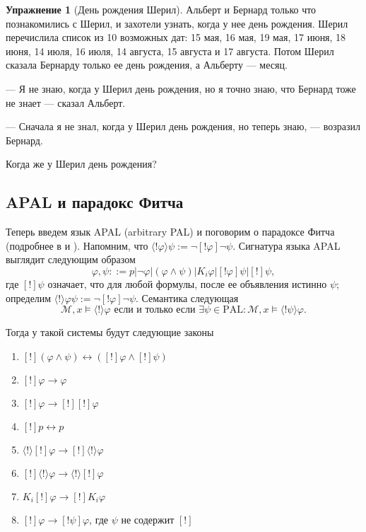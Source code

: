 \documentclass[openany]{book}
\theoremstyle{plain}
\theoremstyle{definition}
\newtheorem{xrc}{Упражнение}[]
\begin{document}
\begin{xrc}[День рождения Шерил]
Альберт и Бернард только что познакомились с Шерил, и захотели узнать, когда у нее день рождения. Шерил перечислила список из 10 возможных дат: 15 мая, 16 мая, 19 мая, 17 июня, 18 июня, 14 июля, 16 июля, 14 августа, 15 августа и 17 августа. Потом Шерил сказала Бернарду только ее день рождения, а Альберту --- месяц.

--- Я не знаю, когда у Шерил день рождения, но я точно знаю, что Бернард тоже не знает --- сказал Альберт.

--- Сначала я не знал, когда у Шерил день рождения, но теперь знаю, --- возразил Бернард.

Когда же у Шерил день рождения?

\end{xrc}

\subsection{APAL и парадокс Фитча}

Теперь введем язык APAL (arbitrary PAL) и поговорим о парадоксе Фитча (подробнее в \cite{Benthem} и \cite{Balbiani}). Напомним, что \(\langle !\varphi \rangle \psi := \neg [!\varphi] \neg \psi\). Сигнатура языка APAL выглядит следующим образом \[\varphi, \psi ::= p | \neg \varphi | (\varphi \land \psi) | K_i \varphi | [!\varphi] \psi | [!] \psi, \] где \([!]\psi\) означает, что для любой формулы, после ее объявления истинно \(\psi\); определим \(\langle ! \rangle \varphi \psi:= \neg [!\varphi] \neg \psi\). Семантика следующая \[\mathcal{M}, x \models \langle ! \rangle \varphi \text{ если и только если } \exists \psi \in \mathrm{PAL} : \mathcal{M}, x \models \langle ! \psi \rangle \varphi.\]

Тогда у такой системы будут следующие законы
\begin{enumerate}
\item \([!](\varphi \land \psi) \leftrightarrow ([!] \varphi \land [!] \psi)\)
\item \([!] \varphi \to \varphi\)
\item \([!] \varphi \to [!][!] \varphi\)
\item \([!]p \leftrightarrow p\)
\item \(\langle ! \rangle [!] \varphi \to [!] \langle ! \rangle \varphi\)
\item \([!] \langle ! \rangle \varphi \to \langle ! \rangle [!] \varphi\)
\item \(K_i [!] \varphi \to [!] K_i \varphi\)
\item \([!] \varphi \to [! \psi] \varphi\), где \(\psi\) не содержит \([!]\)
\end{enumerate}
\end{document}
